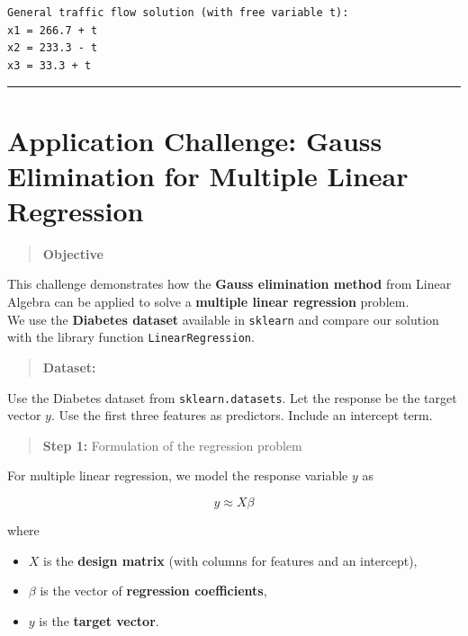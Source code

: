 \documentclass[
  letterpaper,
  DIV=11,
  numbers=noendperiod]{scrreprt}
\providecommand{\tightlist}{%
  \setlength{\itemsep}{0pt}\setlength{\parskip}{0pt}}
\begin{document}
\begin{verbatim}
General traffic flow solution (with free variable t):
x1 = 266.7 + t
x2 = 233.3 - t
x3 = 33.3 + t
\end{verbatim}

\begin{center}\rule{0.5\linewidth}{0.5pt}\end{center}

\section{Application Challenge: Gauss Elimination for Multiple Linear
Regression}\label{application-challenge-gauss-elimination-for-multiple-linear-regression}

\begin{quote}
\textbf{Objective}
\end{quote}

This challenge demonstrates how the \textbf{Gauss elimination method}
from Linear Algebra can be applied to solve a \textbf{multiple linear
regression} problem.\\
We use the \textbf{Diabetes dataset} available in \texttt{sklearn} and
compare our solution with the library function
\texttt{LinearRegression}.

\begin{quote}
\textbf{Dataset:}
\end{quote}

Use the Diabetes dataset from \texttt{sklearn.datasets}. Let the
response be the target vector \(y\). Use the first three features as
predictors. Include an intercept term.

\begin{quote}
\textbf{Step 1:} Formulation of the regression problem
\end{quote}

For multiple linear regression, we model the response variable \(y\) as

\[
y \approx X \beta
\]

where

\begin{itemize}
\tightlist
\item
  \(X\) is the \textbf{design matrix} (with columns for features and an
  intercept),\\
\item
  \(\beta\) is the vector of \textbf{regression coefficients},\\
\item
  \(y\) is the \textbf{target vector}.
\end{itemize}
\end{document}
